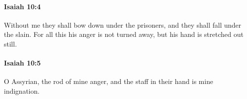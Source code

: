 		\paragraph{Isaiah 10:4} %
			\label{ISAIAH-10-4}

			Without me they shall bow down under the prisoners, and they shall fall under the slain. For all this his anger is not turned away, but his hand is stretched out still.


		\paragraph{Isaiah 10:5} %
			\label{ISAIAH-10-5}

			O Assyrian, the rod of mine anger, and the staff in their hand is mine indignation.


